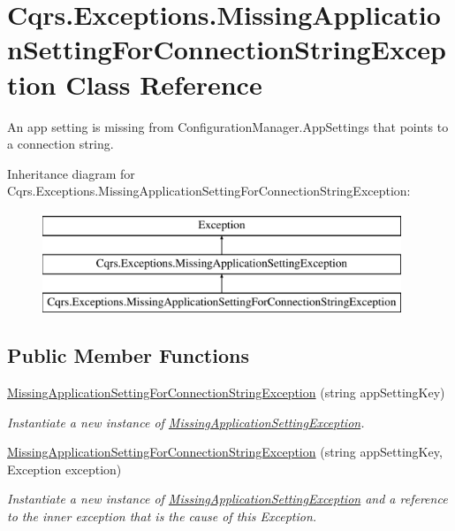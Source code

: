 \hypertarget{classCqrs_1_1Exceptions_1_1MissingApplicationSettingForConnectionStringException}{}\section{Cqrs.\+Exceptions.\+Missing\+Application\+Setting\+For\+Connection\+String\+Exception Class Reference}
\label{classCqrs_1_1Exceptions_1_1MissingApplicationSettingForConnectionStringException}


An app setting is missing from Configuration\+Manager.\+App\+Settings that points to a connection string.  


Inheritance diagram for Cqrs.\+Exceptions.\+Missing\+Application\+Setting\+For\+Connection\+String\+Exception\+:\begin{figure}[H]
\begin{center}
\leavevmode
\includegraphics[height=3.000000cm]{classCqrs_1_1Exceptions_1_1MissingApplicationSettingForConnectionStringException}
\end{center}
\end{figure}
\subsection*{Public Member Functions}
\begin{DoxyCompactItemize}
\item 
\hyperlink{classCqrs_1_1Exceptions_1_1MissingApplicationSettingForConnectionStringException_a1cbfb4c5a94ac501f8bfda5382862e4d_a1cbfb4c5a94ac501f8bfda5382862e4d}{Missing\+Application\+Setting\+For\+Connection\+String\+Exception} (string app\+Setting\+Key)
\begin{DoxyCompactList}\small\item\em Instantiate a new instance of \hyperlink{classCqrs_1_1Exceptions_1_1MissingApplicationSettingException}{Missing\+Application\+Setting\+Exception}. \end{DoxyCompactList}\item 
\hyperlink{classCqrs_1_1Exceptions_1_1MissingApplicationSettingForConnectionStringException_ac007052f2ab651e31647acbdbe2ce7e7_ac007052f2ab651e31647acbdbe2ce7e7}{Missing\+Application\+Setting\+For\+Connection\+String\+Exception} (string app\+Setting\+Key, Exception exception)
\begin{DoxyCompactList}\small\item\em Instantiate a new instance of \hyperlink{classCqrs_1_1Exceptions_1_1MissingApplicationSettingException}{Missing\+Application\+Setting\+Exception} and a reference to the inner {\itshape exception}  that is the cause of this Exception. \end{DoxyCompactList}\end{DoxyCompactItemize}
